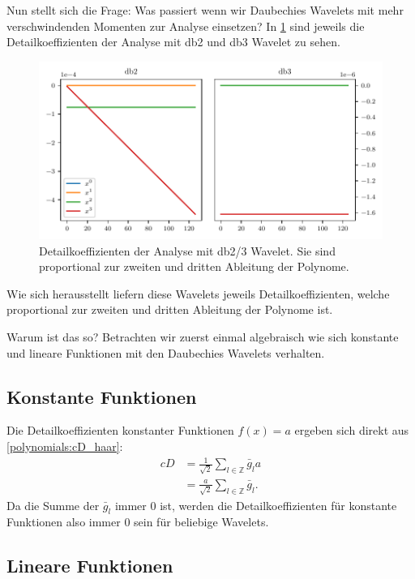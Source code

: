 \begin{refsection}
Nun stellt sich die Frage: Was passiert wenn wir Daubechies Wavelets mit mehr
verschwindenden Momenten zur Analyse einsetzen? In \cref{polynomials:db2_3}
sind jeweils die Detailkoeffizienten der Analyse mit db2 und db3 Wavelet zu
sehen.
\begin{figure}
    \centering
    \includegraphics{papers/polynomials/images/polynomials_signals_db2_3.pdf}
    \caption{Detailkoeffizienten der Analyse mit db2/3 Wavelet. Sie sind
             proportional zur zweiten und dritten Ableitung der
             Polynome.\label{polynomials:db2_3}}
\end{figure}
Wie sich herausstellt liefern diese Wavelets jeweils Detailkoeffizienten,
welche proportional zur zweiten und dritten Ableitung der Polynome ist.

Warum ist das so? Betrachten wir zuerst einmal algebraisch wie sich konstante
und lineare Funktionen mit den Daubechies Wavelets verhalten.

\subsection{Konstante Funktionen}
Die Detailkoeffizienten konstanter Funktionen $f(x) = a$ ergeben sich direkt
aus \cref{polynomials:cD_haar}:
\begin{align*}
    cD &= \frac{1}{\sqrt{2}} \sum_{l\in\mathbb Z} \bar{g}_l a \\
       &= \frac{a}{\sqrt{2}} \sum_{l\in\mathbb Z} \bar{g}_l.
\end{align*}
Da die Summe der $\bar{g}_l$ immer 0 ist, werden die Detailkoeffizienten für
konstante Funktionen also immer 0 sein für beliebige Wavelets.

\subsection{Lineare Funktionen}


\end{refsection}
